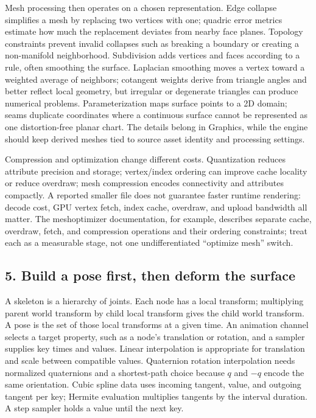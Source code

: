 Mesh processing then operates on a chosen representation. Edge collapse simplifies a mesh by replacing two vertices with one; quadric error metrics estimate how much the replacement deviates from nearby face planes. Topology constraints prevent invalid collapses such as breaking a boundary or creating a non-manifold neighborhood. Subdivision adds vertices and faces according to a rule, often smoothing the surface. Laplacian smoothing moves a vertex toward a weighted average of neighbors; cotangent weights derive from triangle angles and better reflect local geometry, but irregular or degenerate triangles can produce numerical problems. Parameterization maps surface points to a 2D domain; seams duplicate coordinates where a continuous surface cannot be represented as one distortion-free planar chart. The details belong in Graphics, while the engine should keep derived meshes tied to source asset identity and processing settings.

Compression and optimization change different costs. Quantization reduces attribute precision and storage; vertex/index ordering can improve cache locality or reduce overdraw; mesh compression encodes connectivity and attributes compactly. A reported smaller file does not guarantee faster runtime rendering: decode cost, GPU vertex fetch, index cache, overdraw, and upload bandwidth all matter. The meshoptimizer documentation, for example, describes separate cache, overdraw, fetch, and compression operations and their ordering constraints; treat each as a measurable stage, not one undifferentiated ``optimize mesh'' switch.

\subsection{5. Build a pose first, then deform the surface}\label{04-visual-computing-ii-ch037-build-a-pose-first-then-deform-the-surface}

A skeleton is a hierarchy of joints. Each node has a local transform; multiplying parent world transform by child local transform gives the child world transform. A pose is the set of those local transforms at a given time. An animation channel selects a target property, such as a node's translation or rotation, and a sampler supplies key times and values. Linear interpolation is appropriate for translation and scale between compatible values. Quaternion rotation interpolation needs normalized quaternions and a shortest-path choice because \(q\) and \(-q\) encode the same orientation. Cubic spline data uses incoming tangent, value, and outgoing tangent per key; Hermite evaluation multiplies tangents by the interval duration. A step sampler holds a value until the next key.

